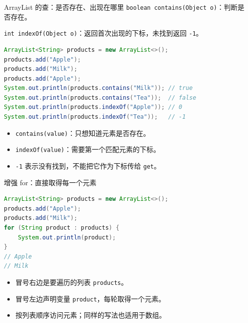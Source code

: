 \documentclass[aspectratio=169]{beamer}
\begin{document}
\begin{frame}[fragile]{ArrayList 的查：是否存在、出现在哪里}
  \texttt{boolean contains(Object o)}：判断是否存在。
  \par
  \texttt{int indexOf(Object o)}：返回首次出现的下标，未找到返回 \texttt{-1}。
  \begin{lstlisting}[language=Java]
ArrayList<String> products = new ArrayList<>();
products.add("Apple");
products.add("Milk");
products.add("Apple");
System.out.println(products.contains("Milk")); // true
System.out.println(products.contains("Tea"));  // false
System.out.println(products.indexOf("Apple")); // 0
System.out.println(products.indexOf("Tea"));   // -1
  \end{lstlisting}
  \begin{itemize}
    \item \texttt{contains(value)}：只想知道元素是否存在。
    \item \texttt{indexOf(value)}：需要第一个匹配元素的下标。
    \item \texttt{-1} 表示没有找到，\alert{不能}把它作为下标传给 \texttt{get}。
  \end{itemize}
\end{frame}



\begin{frame}[fragile]{增强 for：直接取得每一个元素}
  \begin{lstlisting}[language=Java]
ArrayList<String> products = new ArrayList<>();
products.add("Apple");
products.add("Milk");
for (String product : products) {
    System.out.println(product);
}
// Apple
// Milk
  \end{lstlisting}
  \begin{itemize}
    \item 冒号右边是要遍历的列表 \texttt{products}。
    \item 冒号左边声明变量 \texttt{product}，每轮取得一个元素。
    \item 按列表顺序访问元素；同样的写法也适用于数组。
  \end{itemize}
\end{frame}

\end{document}
